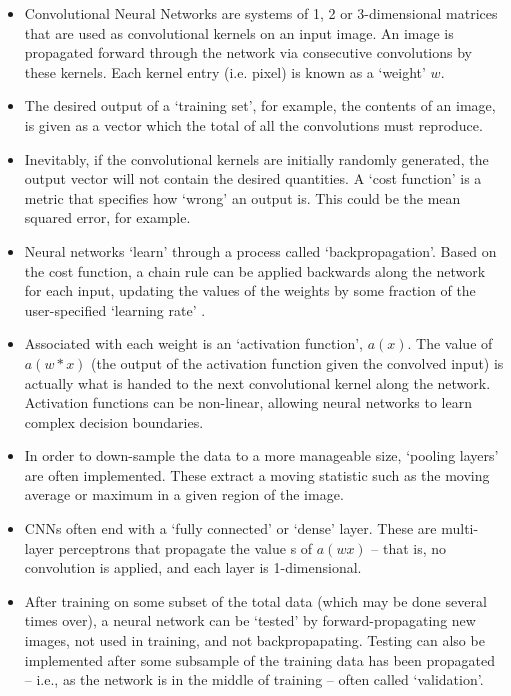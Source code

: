 \begin{itemize}
\item Convolutional Neural Networks are systems of 1, 2 or 3-dimensional matrices that are used as convolutional kernels on an input image. An image is propagated forward through the network via consecutive convolutions by these kernels. Each kernel entry (i.e. pixel) is known as a `weight' $w$.

\item The desired output of a `training set', for example, the contents of an image, is given as a vector which the total of all the convolutions must reproduce.

\item Inevitably, if the convolutional kernels are initially randomly generated, the output vector will not contain the desired quantities. A `cost function' is a metric that specifies how `wrong' an output is. This could be the mean squared error, for example.

\item Neural networks `learn' through a process called `backpropagation'. Based on the cost function, a chain rule can be applied backwards along the network for each input, updating the values of the weights by some fraction of the user-specified `learning rate' \citep{Rumelhart.86}.

\item Associated with each weight is an `activation function', $a(x)$. The value of $a(w*x)$ (the output of the activation function given the convolved input) is actually what is handed to the next convolutional kernel along the network. Activation functions can be non-linear, allowing neural networks to learn complex decision boundaries.

\item In order to down-sample the data to a more manageable size, `pooling layers' are often implemented. These extract a moving statistic such as the moving average or maximum in a given region of the image.

\item CNNs often end with a `fully connected' or `dense' layer. These are multi-layer perceptrons \citep[e.g.][]{Rosenblatt.61} that propagate the value s of $a(wx)$ -- that is, no convolution is applied, and each layer is 1-dimensional.

\item After training on some subset of the total data (which may be done several times over), a neural network can be `tested' by forward-propagating new images, not used in training, and not backpropapating. Testing can also be implemented after some subsample of the training data has been propagated -- i.e., as the network is in the middle of training -- often called `validation'.
\end{itemize}

